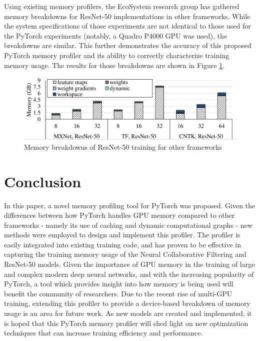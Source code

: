 \documentclass[12pt,letterpaper]{article}
\begin{document}
Using existing memory profilers, the EcoSystem research group has gathered memory breakdowns for ResNet-50 implementations in other frameworks. While the system specifications of those experiments are not identical to those used for the PyTorch experiments (notably, a Quadro P4000 GPU was used), the breakdowns are similar. This further demonstrates the accuracy of this proposed PyTorch memory profiler and its ability to correctly characterize training memory usage. The results for those breakdowns are shown in Figure \ref{fig:other_frameworks_resnet}.

\begin{figure}[H]
\centering
\includegraphics[width=1.0\textwidth]{ecosystem_resnet_other_frameworks_bar_graph.PNG}
\captionsetup{width=0.8\linewidth}
\caption{Memory breakdowns of ResNet-50 training for other frameworks \cite{tbd_benchmarks}}
\label{fig:other_frameworks_resnet}
\end{figure}
\newpage

\section{Conclusion}
\label{conclusion}
In this paper, a novel memory profiling tool for PyTorch was proposed. Given the differences between how PyTorch handles GPU memory compared to other frameworks - namely its use of caching and dynamic computational graphs - new methods were employed to design and implement this profiler. The profiler is easily integrated into existing training code, and has proven to be effective in capturing the training memory usage of the Neural Collaborative Filtering and ResNet-50 models. Given the importance of GPU memory in the training of large and complex modern deep neural networks, and with the increasing popularity of PyTorch, a tool which provides insight into how memory is being used will benefit the community of researchers. Due to the recent rise of multi-GPU training, extending this profiler to provide a device-based breakdown of memory usage is an area for future work. As new models are created and implemented, it is hoped that this PyTorch memory profiler will shed light on new optimization techniques that can increase training efficiency and performance.
\end{document}
